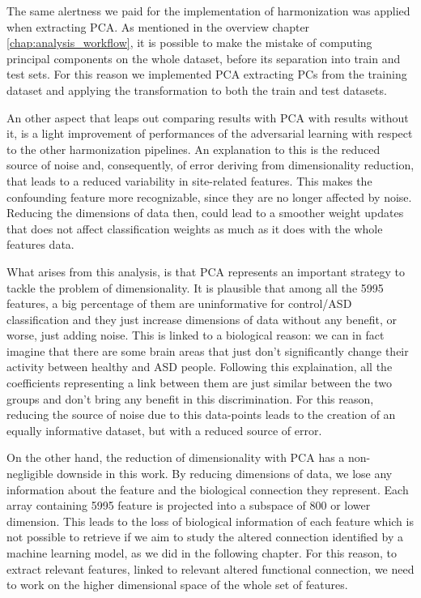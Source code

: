 \documentclass[11pt]{report}
\begin{document}
\hfill

\noindent The same alertness we paid for the implementation of harmonization was applied when extracting PCA. 
As mentioned in the overview chapter \ref{chap:analysis_workflow}, it is possible to make the mistake of computing principal components on the whole dataset, before its separation into train and test sets.
For this reason we implemented PCA extracting PCs from the training dataset and applying the transformation to both the train and test datasets.

An other aspect that leaps out comparing results with PCA with results without it, is a light improvement of performances of the adversarial learning with respect to the other harmonization pipelines.
An explanation to this is the reduced source of noise and, consequently, of error deriving from dimensionality reduction, that leads to a reduced variability in site-related features.
This makes the confounding feature more recognizable, since they are no longer affected by noise. 
Reducing the dimensions of data then, could lead to a smoother weight updates that does not affect classification weights as much as it does with the whole features data.

What arises from this analysis, is that PCA represents an important strategy to tackle the problem of dimensionality.
It is plausible that among all the 5995 features, a big percentage of them are uninformative for control/ASD classification and they just increase dimensions of data without any benefit, or worse, just adding noise.
This is linked to a biological reason: we can in fact imagine that there are some brain areas that just don't significantly change their activity between healthy and ASD people.
Following this explaination, all the coefficients representing a link between them are just similar between the two groups and don't bring any benefit in this discrimination.
For this reason, reducing the source of noise due to this data-points leads to the creation of an equally informative dataset, but with a reduced source of error.

On the other hand, the reduction of dimensionality with PCA has a non-negligible downside in this work.
By reducing dimensions of data, we lose any information about the feature and the biological connection they represent.
Each array containing 5995 feature is projected into a subspace of 800 or lower dimension. 
This leads to the loss of biological information of each feature which is not possible to retrieve if we aim to study the altered connection identified by a machine learning model, as we did in the following chapter.  
For this reason, to extract relevant features, linked to relevant altered functional connection, we need to work on the higher dimensional space of the whole set of features.
\end{document}
